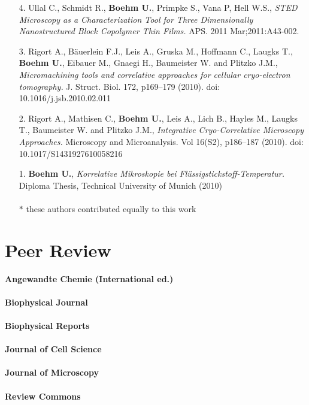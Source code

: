 \documentclass[margin,line]{res}
\begin{document}
\begin{resume}
\begin{enumerate}[leftmargin=*]
\item[4.] Ullal C., Schmidt R., {\bf  Boehm U.}, Primpke S., Vana P, Hell W.S.,  {\it STED Microscopy as a Characterization Tool for Three Dimensionally Nanostructured Block Copolymer Thin Films.} APS. 2011 Mar;2011:A43-002.

\item[3.] Rigort A., Bäuerlein F.J., Leis A., Gruska M., Hoffmann C., Laugks T., {\bf Boehm U.}, Eibauer M., Gnaegi H., Baumeister W. and Plitzko J.M.,  {\it Micromachining tools and correlative approaches for cellular cryo-electron tomography.} J. Struct. Biol. 172, p169–179 (2010). doi: 10.1016/j.jsb.2010.02.011

\item[2.] Rigort A., Mathisen C., {\bf Boehm U.}, Leis A., Lich B., Hayles M., Laugks T., Baumeister W. and Plitzko J.M.,  {\it Integrative Cryo-Correlative Microscopy Approaches.}
Microscopy and Microanalysis. Vol 16(S2), p186–187 (2010). doi: 10.1017/S1431927610058216 

\item[1.]{\bf Boehm U.},  {\it Korrelative Mikroskopie bei Flüssigstickstoff-Temperatur.} Diploma Thesis, Technical University of Munich (2010)  \\ \\
$*$ these authors contributed equally to this work

\end{enumerate}


\section{\sc Peer Review} 

{\bf   Angewandte Chemie (International ed.)} \\
\vspace*{-3mm}\\
{\bf   Biophysical Journal}\\
\vspace*{-3mm}\\
{\bf   Biophysical Reports}\\
\vspace*{-3mm}\\
{\bf   Journal of Cell Science}\\
\vspace*{-3mm}\\
{\bf  Journal of Microscopy}\\
\vspace*{-3mm}\\
{\bf    Review Commons}\\


\end{resume}
\end{document}
